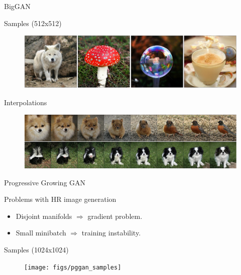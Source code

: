 \begin{frame}{BigGAN}
	\begin{block}{Samples (512x512)}
		\begin{figure}
			\centering
			\includegraphics[width=\linewidth]{figs/biggan_samples}
		\end{figure}
	\end{block}
	\vspace{-0.4cm}
	\begin{block}{Interpolations}
		\begin{figure}
			\centering
			\includegraphics[width=\linewidth]{figs/biggan_interpolations}
		\end{figure}
	\end{block}
\end{frame}
\begin{frame}{Progressive Growing GAN}
	\begin{block}{Problems with HR image generation}
		\begin{itemize}
			\item Disjoint manifolds $\Rightarrow$ gradient problem.
			\item Small minibatch $\Rightarrow$ training instability.
		\end{itemize}
	\end{block}
	\vspace{-0.2cm}
	\begin{block}{Samples (1024x1024)}
		\vspace{-0.2cm}
		\begin{figure}
			\texttt{[image: figs/pggan\_samples]}
		\end{figure}
	\end{block}
\end{frame}
